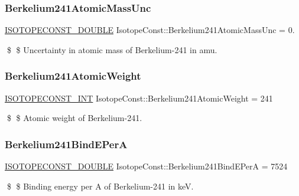 \subsubsection{\texorpdfstring{Berkelium241\+Atomic\+Mass\+Unc}{Berkelium241AtomicMassUnc}}
{\footnotesize\ttfamily \mbox{\hyperlink{group___isotope_const-_macros_ga8f45a7272ce02c0b4c65c44636ed719a}{I\+S\+O\+T\+O\+P\+E\+C\+O\+N\+S\+T\+\_\+\+D\+O\+U\+B\+LE}} Isotope\+Const\+::\+Berkelium241\+Atomic\+Mass\+Unc = 0.}

\$ \$ Uncertainty in atomic mass of Berkelium-\/241 in amu. \mbox{\label{group___isotope_const-_berkelium-_bk241_ga362b052df40ded068f75fc58f553fa58}} 
\subsubsection{\texorpdfstring{Berkelium241\+Atomic\+Weight}{Berkelium241AtomicWeight}}
{\footnotesize\ttfamily \mbox{\hyperlink{group___isotope_const-_macros_ga5f18360b3e99483a35c32d789e62621c}{I\+S\+O\+T\+O\+P\+E\+C\+O\+N\+S\+T\+\_\+\+I\+NT}} Isotope\+Const\+::\+Berkelium241\+Atomic\+Weight = 241}

\$ \$ Atomic weight of Berkelium-\/241. \mbox{\label{group___isotope_const-_berkelium-_bk241_ga6ea92138cbf67f4e9edca429cc158c86}} 
\subsubsection{\texorpdfstring{Berkelium241\+Bind\+E\+PerA}{Berkelium241BindEPerA}}
{\footnotesize\ttfamily \mbox{\hyperlink{group___isotope_const-_macros_ga8f45a7272ce02c0b4c65c44636ed719a}{I\+S\+O\+T\+O\+P\+E\+C\+O\+N\+S\+T\+\_\+\+D\+O\+U\+B\+LE}} Isotope\+Const\+::\+Berkelium241\+Bind\+E\+PerA = 7524}

\$ \$ Binding energy per A of Berkelium-\/241 in keV. \mbox{\label{group___isotope_const-_berkelium-_bk241_gafb0c303f5ce957c4f72f61ac0eb308fb}} 
